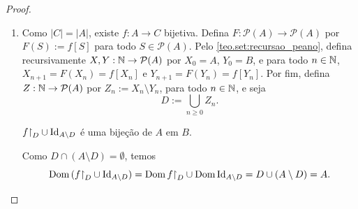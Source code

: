 \begin{proof}
\begin{enumerate}[leftmargin=*, align=left, label=\textbf{(\alph*)}]
\begin{midproof}
\begin{align*}
                            &= f[Y] \cup (A \setminus Y) \\
                            &= f[Y] \cup (A \setminus (X_0 \cup f[Y])) \\
                            &= f[Y] \cup ( (A \setminus X_0) \cap (A \setminus f[Y]) ) \\
                            &= (f[Y] \cup (A \setminus X_0) ) \cap (f[Y] \cup (A \setminus f[Y]) ) \\
                            &= (f[Y] \cup (A \setminus (A \setminus B) ) ) \cap A \\
                            &= f[Y] \cup ( (A \setminus A) \cup (A \cap B) ) \\
                            &= f[Y] \cup B.
                        \end{align*}
                    Como $X_n \subseteq B$ para todo $n \geq 1$, temos $f[Y] \subseteq B$, donde $f[Y] \cup B = B$, isto é,
                        \[
                            \Img \, (f \restriction_Y \cup \id_{A \setminus Y}) = B.
                        \]
                    Como $f \restriction_Y$ é bijetiva em $f[Y]$ e $\id_{A \setminus Y}$ é bijetiva em $A \setminus Y$, das observações acima segue que $f \restriction_Y \cup \id_{A \setminus Y}$ é bijetiva em $B$.
                    \whiteproof
                \end{midproof}
            Logo, $|B| = |A|$. \blackproof
            \item Como $|C| = |A|$, existe $f : A \to C$ bijetiva. Defina $F : \mathcal{P}(A) \to \mathcal{P}(A)$ por $F(S) := f[S]$ para todo $S \in \mathcal{P}(A)$. Pelo \cref{teo.set:recursao_peano}, defina recursivamente $X, Y : \mathbb{N} \to \mathcal{P}(A)$ por $X_0 = A$, $Y_0 = B$, e para todo $n \in \mathbb{N}$, $X_{n+1} = F(X_n) = f[X_n]$ e $Y_{n+1} = F(Y_n) = f[Y_n]$. Por fim, defina $Z : \mathbb{N} \to \mathcal{P}(A)$ por $Z_n := X_n \setminus Y_n$, para todo $n \in \mathbb{N}$, e seja
                \[
                    D := \bigcup_{n \geq 0} Z_n.
                \]
                \begin{claim}
                    $f \restriction_D \cup \id_{A \setminus D}$ é uma bijeção de $A$ em $B$.
                \end{claim}
                \begin{midproof}
                    Como $D \cap (A \setminus D) = \emptyset$, temos
                        \[
                            \Dom \, (f \restriction_D \cup \id_{A \setminus D}) = \Dom f \restriction_D \cup \Dom \id_{A \setminus D} = D \cup (A \setminus D) = A.
\]
\end{midproof}
\end{enumerate}
\end{proof}
